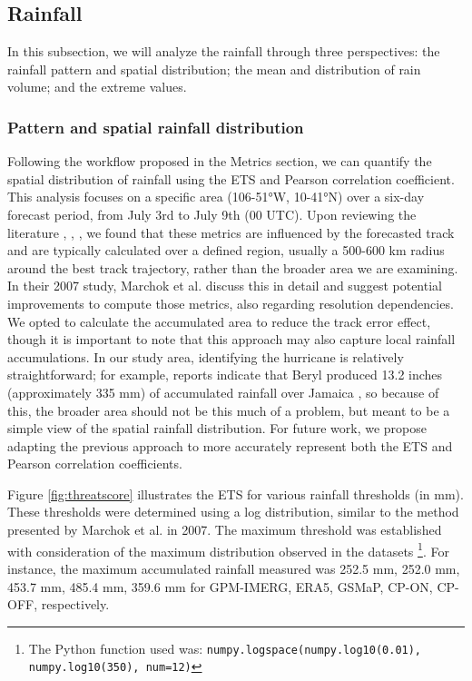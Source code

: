 \subsection{Rainfall}

In this subsection, we will analyze the rainfall through three perspectives: the rainfall pattern and spatial distribution; the mean and distribution of rain volume; and the extreme values.

\subsubsection{Pattern and spatial rainfall distribution}

Following the workflow proposed in the Metrics section, we can quantify the spatial distribution of rainfall using the ETS and Pearson correlation coefficient. This analysis focuses on a specific area (106-51°W, 10-41°N) over a six-day forecast period, from July 3rd to July 9th (00 UTC). Upon reviewing the literature \cite{marchok2007validation}, \cite{brackins2020evaluation}, \cite{luitel2018verification}, we found that these metrics are influenced by the forecasted track and are typically calculated over a defined region, usually a 500-600 km radius around the best track trajectory, rather than the broader area we are examining. In their 2007 study, Marchok et al. discuss this in detail and suggest potential improvements to compute those metrics, also regarding resolution dependencies. We opted to calculate the accumulated area to reduce the track error effect, though it is important to note that this approach may also capture local rainfall accumulations. In our study area, identifying the hurricane is relatively straightforward; for example, reports indicate that Beryl produced 13.2 inches (approximately 335 mm) of accumulated rainfall over Jamaica \cite{li2025generative}, so because of this, the broader area should not be this much of a problem, but meant to be a simple view of the spatial rainfall distribution. For future work, we propose adapting the previous approach to more accurately represent both the ETS and Pearson correlation coefficients.

Figure \ref{fig:threatscore} illustrates the ETS for various rainfall thresholds (in mm). These thresholds were determined using a log distribution, similar to the method presented by Marchok et al. in 2007. The maximum threshold was established with consideration of the maximum distribution observed in the datasets \footnote{The Python function used was: \texttt{numpy.logspace(numpy.log10(0.01), numpy.log10(350), num=12)}}. For instance, the maximum accumulated rainfall measured was 252.5 mm, 252.0 mm, 453.7 mm, 485.4 mm, 359.6 mm for GPM-IMERG, ERA5, GSMaP, CP-ON, CP-OFF, respectively.

